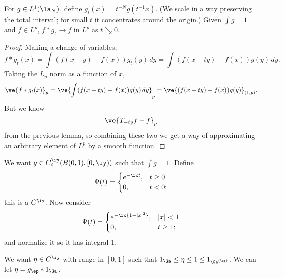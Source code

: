 \begin{thm}
For $g\in L^1(\la_N)$, define $g_t(x)=t^{-N}g(t^{-1}x)$. (We scale in a way preserving the total interval; for small $t$ it concentrates around the origin.)  Given $\int g=1$ and $f\in L^p$, $f*g_t\to f$ in $L^p$ as $t\searrow 0$.
\end{thm}
\begin{proof}
Making a change of variables,
\[
f*g_t(x)=\int(f(x-y)-f(x))g_t(y)\,dy
=\int (f(x-ty)-f(x))g(y)\,dy.
\]
Taking the $L_p$ norm as a function of $x$, %
\[\ve{f*g_t(x)}_p
=\ve{\int (f(x-ty)-f(x))g(y)\,dy}_p
=\ve{(f(x-ty)-f(x))g(y)}_{(1,p)}.\]
But we know
\[
\ve{T_{-ty}f-f}_p
\]
from the previous lemma, so combining these two we get a way of approximating an arbitrary element of $L^p$ by a smooth function. 
\end{proof}

We want $g\in C^{\iy}_{c}(B(0,1),[0,\iy))$ such that $\int g=1$. Define
\[
\Psi(t)=\begin{cases}
e^{-\rc t},&t\ge 0\\
0,&t< 0;
\end{cases}
\]
this is a $C^{\iy}$. %
Now consider 
\[
\Psi(t)=\begin{cases}
e^{-\rc{1-|x|^2}},&|x|< 1\\
0,&t\ge 1;
\end{cases}
\]
and normalize it so it has integral 1.

We want $\eta\in C^{\iy}$ with range in $[0,1]$ such that $1_{\Ga}\le \eta\le 1\le 1_{\Ga^{(\ep)}}$. We can let $\eta=g_{\ep}*1_{\Ga}$.
